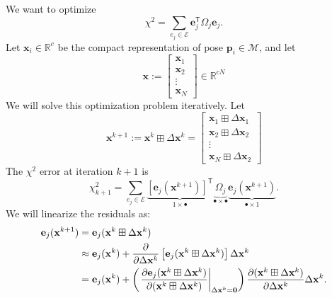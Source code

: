 \documentclass{article}
\newcommand{\transp}{{\scriptstyle{\mathsf{T}}}}
\begin{document}
We want to optimize
%
\begin{equation*}
    \chi^2 = \sum_{e_j \in \mathcal{E}} \mathbf{e}_j^\transp \Omega_j \mathbf{e}_j.
\end{equation*}
%
Let $\mathbf{x}_i \in \mathbb{R}^c$ be the compact representation of pose $\mathbf{p}_i \in \mathcal{M}$, and let
%
\begin{equation*}
    \mathbf{x} := \begin{bmatrix} \mathbf{x}_1 \\ \mathbf{x}_2 \\ \vdots \\ \mathbf{x}_N \end{bmatrix} \in \mathbb{R}^{cN}
\end{equation*}
%
We will solve this optimization problem iteratively.  Let
%
\begin{equation}
    \mathbf{x}^{k+1} := \mathbf{x}^k \boxplus \Delta \mathbf{x}^k = \begin{bmatrix} \mathbf{x}_1 \boxplus \Delta \mathbf{x}_1 \\ \mathbf{x}_2 \boxplus \Delta \mathbf{x}_2 \\ \vdots \\ \mathbf{x}_N \boxplus \Delta \mathbf{x}_2 \end{bmatrix} \label{eq:update}
\end{equation}
%
The $\chi^2$ error at iteration $k+1$ is
\begin{equation}
    \chi_{k+1}^2 = \sum_{e_j \in \mathcal{E}} \underbrace{\left[ \mathbf{e}_j(\mathbf{x}^{k+1}) \right]^\transp}_{1 \times \bullet} \underbrace{\Omega_j}_{\bullet \times \bullet} \underbrace{\mathbf{e}_j(\mathbf{x}^{k+1})}_{\bullet \times 1}.  \label{eq:chisq_at_kplusone}
\end{equation}
%
We will linearize the residuals as:
%
\begin{align}
    \mathbf{e}_j(\mathbf{x}^{k+1}) &= \mathbf{e}_j(\mathbf{x}^k \boxplus \Delta \mathbf{x}^k) \notag \\
    &\approx \mathbf{e}_j(\mathbf{x}^{k}) + \frac{\partial}{\partial \Delta \mathbf{x}^k} \left[ \mathbf{e}_j(\mathbf{x}^k \boxplus \Delta \mathbf{x}^k) \right] \Delta \mathbf{x}^k \notag \\
    &= \mathbf{e}_j(\mathbf{x}^{k}) + \left( \left. \frac{\partial \mathbf{e}_j(\mathbf{x}^k \boxplus \Delta \mathbf{x}^k)}{\partial (\mathbf{x}^k \boxplus \Delta \mathbf{x}^k)} \right|_{\Delta \mathbf{x}^k = \mathbf{0}} \right) \frac{\partial (\mathbf{x}^k \boxplus \Delta \mathbf{x}^k)}{\partial \Delta \mathbf{x}^k} \Delta \mathbf{x}^k.  \label{eq:linearization}
\end{align}
\end{document}
